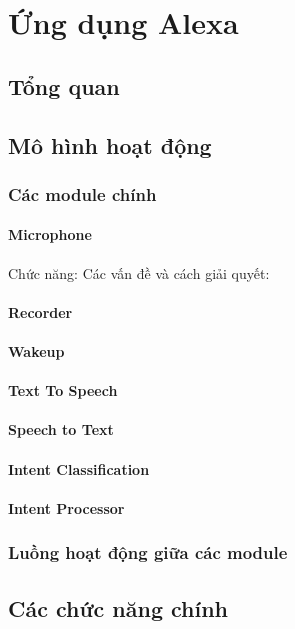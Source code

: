 \chapter{Ứng dụng Alexa}
\ifpdf
    \graphicspath{{Chapter5/Chapter5Figs/PNG/}{Chapter5/Chapter5Figs/PDF/}{Chapter5/Chapter5Figs/}}
\else
    \graphicspath{{Chapter5/Chapter5Figs/EPS/}{Chapter5/Chapter5Figs/}}
\fi

\section{Tổng quan}
\section{Mô hình hoạt động}
\subsection{Các module chính}
\subsubsection{Microphone}
Chức năng:
Các vấn đề và cách giải quyết:
\subsubsection{Recorder}
\subsubsection{Wakeup}
\subsubsection{Text To Speech}
\subsubsection{Speech to Text}
\subsubsection{Intent Classification}
\subsubsection{Intent Processor}
\subsection{Luồng hoạt động giữa các module}
\section{Các chức năng chính}
